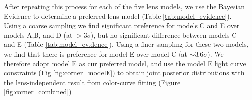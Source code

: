 \documentclass[12pt,dvipsnames]{article}
\def\SNABC{AT 2016{\textcolor{Gray}{tbd}}\xspace}
\begin{document}
After repeating this process for each of the five lens models, we use the Bayesian Evidence to determine a preferred lens model (Table \ref{tab:model_evidence}). Using a coarse sampling we find significant preference for models C and E over models A,B, and D (at $>3\sigma$), but no significant difference between models C and E (Table \ref{tab:model_evidence}). Using a finer sampling for these two models, we find that there is preference for model E over model C (at $\sim3.6\sigma$). We therefore adopt model E as our preferred model, and use the model E light curve constraints (Fig \ref{fig:corner_modelE}) to obtain joint posterior distributions with the lens-independent result from color-curve fitting (Figure \ref{fig:corner_combined}). 


\end{document}
